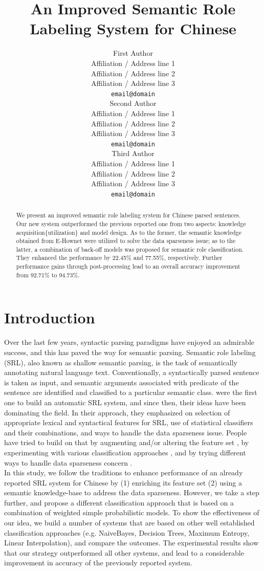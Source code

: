 \documentclass[11pt]{article}
\title{An Improved Semantic Role Labeling System for Chinese}
\author{First Author \\
  Affiliation / Address line 1 \\
  Affiliation / Address line 2 \\
  Affiliation / Address line 3 \\
  {\tt email@domain} \\\And
  Second Author \\
  Affiliation / Address line 1 \\
  Affiliation / Address line 2 \\
  Affiliation / Address line 3 \\
  {\tt email@domain} \\\And
    Third Author \\
    Affiliation / Address line 1 \\
    Affiliation / Address line 2 \\
    Affiliation / Address line 3 \\
    {\tt email@domain} \\}
\date{}
\begin{document}
\maketitle
\begin{abstract}
We present an improved semantic role labeling system for Chinese parsed sentences. Our new system outperformed the previous reported one from two aspects: knowledge acquisition\{utilization\} and model design. As to the former, the semantic knowledge obtained from E-Hownet were utilized to solve the data sparseness issue; as to the latter, a combination of back-off models was proposed for semantic role classification. They enhanced the performance by 22.45\% and 77.55\%, respectively. Further performance gains through post-processing lead to an overall accuracy improvement from 92.71\% to 94.73\%.           
\end{abstract}
\section{Introduction}
Over the last few years, syntactic parsing paradigms have enjoyed an admirable success, and this has paved the way for semantic parsing. Semantic role labeling (SRL), also known as shallow semantic parsing, is the task of semantically annotating natural language text. Conventionally, a syntactically parsed sentence is taken as input, and semantic arguments associated with predicate of the sentence are identified and classified to a particular semantic class. \cite{Gildea:2002} were the first one to build an automatic SRL system, and since then, their ideas have been dominating the field. In their approach, they emphasized on selection of appropriate lexical and syntactical features for SRL, use of statistical classifiers and their combinations, and ways to handle the data sparseness issue. People have tried to build on that by augmenting and/or altering the feature set \cite{Chen:2003:UDL:1119355.1119361,Xue04calibratingfeatures}, by experimenting with various classification approaches \cite{Park:2005:MEB:1706543.1706583,tan-wang-2009}, and by trying different ways to handle data sparseness concern \cite{Zapirain:2007:USS:1621474.1621551,Lin:2010:CSR:1909632.1912231}. \\
In this study, we follow the traditions to enhance performance of an already reported SRL system for Chinese \cite{you-chen:2004} by (1) enriching its feature set (2) using a semantic knowledge-base to address the data sparseness. However, we take a step further, and propose a different classification approach that is based on a combination of weighted simple probabilistic models. To show the effectiveness of our idea, we build a number of systems that are based on other well established classification approaches (e.g. NaiveBayes, Decision Trees, Maximum Entropy, Linear Interpolation), and compare the outcomes. The experimental results show that our strategy outperformed all other systems, and lead to a considerable improvement in accuracy of the previously reported system.
\end{document}
